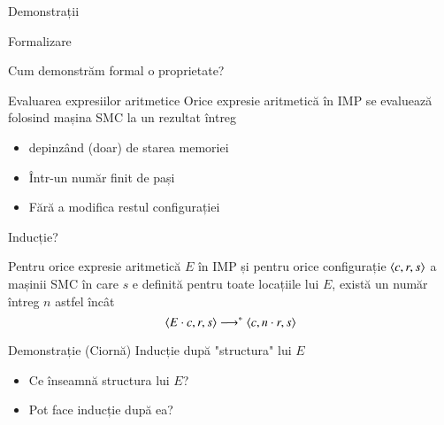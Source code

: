 \documentclass[xcolor=pdftex,romanian,colorlinks]{beamer}
\begin{document}
\begin{section}{Demonstrații}
\begin{subsection}{Formalizare}
\begin{frame}{Cum demonstrăm formal o proprietate?}
\begin{block}{Evaluarea expresiilor aritmetice}
Orice expresie aritmetică în IMP se evaluează folosind mașina SMC la un rezultat întreg
\begin{itemize}
\item depinzând (doar) de starea memoriei
\item Într-un număr finit de pași
\item Fără a modifica restul configurației
\end{itemize}
\end{block}

\end{frame}

\begin{frame}{Inducție?}
\begin{theorem}
Pentru orice expresie aritmetică $E$ în IMP și pentru  orice configurație ${\langle{c,r,s}\rangle}$ a mașinii SMC în care $s$ e definită pentru toate locațiile lui $E$, există un număr întreg $n$ astfel încât 
$${\langle{E\cdot c,  r, s}\rangle} \longrightarrow^\ast {\ensuremath \langle{c, n\cdot r, s}\rangle}$$
\end{theorem}

\begin{block}{Demonstrație (Ciornă)}
Inducție după "structura" lui $E$
\begin{itemize}
\item Ce înseamnă structura lui $E$?
\item Pot face inducție după ea?
\end{itemize}
\end{block}
\end{frame}

\end{subsection}
\end{section}
\end{document}

